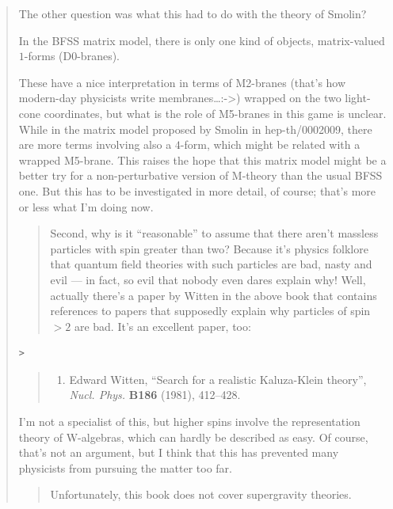 \documentclass{article}
\def\tightlist{}
\begin{document}
\begin{quote}
The other question was what this had to do with the theory of Smolin?

In the BFSS matrix model, there is only one kind of objects,
matrix-valued \(1\)-forms (D0-branes).

These have a nice interpretation in terms of M2-branes (that's how
modern-day physicists write membranes\ldots:-\textgreater) wrapped on
the two light-cone coordinates, but what is the role of M5-branes in
this game is unclear. While in the matrix model proposed by Smolin in
hep-th/0002009, there are more terms involving also a \(4\)-form, which
might be related with a wrapped M5-brane. This raises the hope that this
matrix model might be a better try for a non-perturbative version of
M-theory than the usual BFSS one. But this has to be investigated in
more detail, of course; that's more or less what I'm doing now.

\begin{quote}
Second, why is it ``reasonable'' to assume that there aren't massless
particles with spin greater than two? Because it's physics folklore that
quantum field theories with such particles are bad, nasty and evil ---
in fact, so evil that nobody even dares explain why! Well, actually
there's a paper by Witten in the above book that contains references to
papers that supposedly explain why particles of spin \(> 2\) are bad.
It's an excellent paper, too:
\end{quote}

\begin{verbatim}
>
\end{verbatim}

\begin{quote}
\begin{enumerate}
\def\labelenumi{\arabic{enumi})}
\setcounter{enumi}{1}
\tightlist
\item
  Edward Witten, ``Search for a realistic Kaluza-Klein theory'',
  \emph{Nucl. Phys.} \textbf{B186} (1981), 412--428.
\end{enumerate}
\end{quote}

I'm not a specialist of this, but higher spins involve the
representation theory of W-algebras, which can hardly be described as
easy. Of course, that's not an argument, but I think that this has
prevented many physicists from pursuing the matter too far.

\begin{quote}
Unfortunately, this book does not cover supergravity theories.
\end{quote}


\end{quote}
\end{document}
